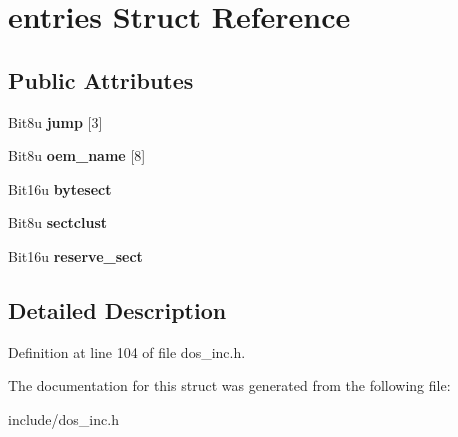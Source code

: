 \hypertarget{structentries}{\section{entries Struct Reference}
\label{structentries}
}
\subsection*{Public Attributes}
\begin{DoxyCompactItemize}
\item 
\hypertarget{structentries_ad7cc12525a8a245a37db3000ca8a064e}{Bit8u {\bfseries jump} \mbox{[}3\mbox{]}}\label{structentries_ad7cc12525a8a245a37db3000ca8a064e}

\item 
\hypertarget{structentries_a256c84126697f0da3f024e646d176b8b}{Bit8u {\bfseries oem\-\_\-name} \mbox{[}8\mbox{]}}\label{structentries_a256c84126697f0da3f024e646d176b8b}

\item 
\hypertarget{structentries_a24cb66b7f6666e293a05432f0cd7f402}{Bit16u {\bfseries bytesect}}\label{structentries_a24cb66b7f6666e293a05432f0cd7f402}

\item 
\hypertarget{structentries_ae87e1ef64d86649668bf20363560f615}{Bit8u {\bfseries sectclust}}\label{structentries_ae87e1ef64d86649668bf20363560f615}

\item 
\hypertarget{structentries_abe4df1af1aaa7523b5f10974d27a6bb1}{Bit16u {\bfseries reserve\-\_\-sect}}\label{structentries_abe4df1af1aaa7523b5f10974d27a6bb1}

\end{DoxyCompactItemize}


\subsection{Detailed Description}


Definition at line 104 of file dos\-\_\-inc.\-h.



The documentation for this struct was generated from the following file\-:\begin{DoxyCompactItemize}
\item 
include/dos\-\_\-inc.\-h\end{DoxyCompactItemize}
